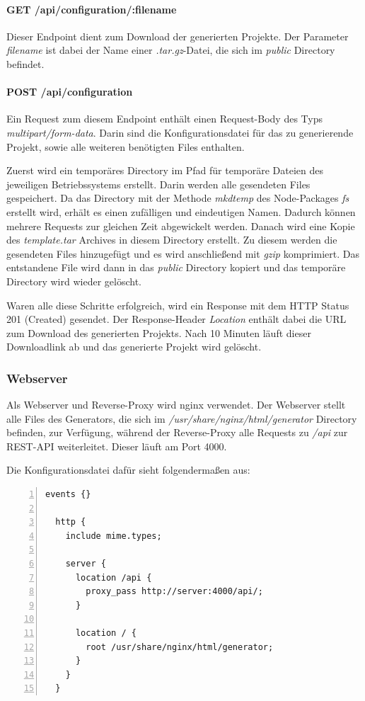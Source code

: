 \paragraph{GET /api/configuration/:filename}
Dieser Endpoint dient zum Download der generierten Projekte.
Der Parameter \textit{filename} ist dabei der Name einer \textit{.tar.gz}-Datei, die sich im \textit{public}
Directory befindet.

\paragraph{POST /api/configuration}
Ein Request zum diesem Endpoint enthält einen Request-Body des Typs
\textit{multipart/form-data}.
Darin sind die Konfigurationsdatei für das zu generierende Projekt, sowie alle weiteren benötigten Files enthalten.

Zuerst wird ein temporäres Directory im Pfad für temporäre Dateien des jeweiligen Betriebssystems erstellt.
Darin werden alle gesendeten Files gespeichert.
Da das Directory mit der Methode \textit{mkdtemp} des Node-Packages \textit{fs} erstellt wird, erhält es einen
zufälligen und eindeutigen Namen.
Dadurch können mehrere Requests zur gleichen Zeit abgewickelt werden.
Danach wird eine Kopie des \textit{template.tar} Archives in diesem Directory erstellt.
Zu diesem werden die gesendeten Files hinzugefügt und es wird anschließend mit \textit{gzip} komprimiert.
Das entstandene File wird dann in das \textit{public} Directory kopiert und das temporäre Directory wird wieder gelöscht.

Waren alle diese Schritte erfolgreich, wird ein Response mit dem HTTP Status 201 (Created)
gesendet.
Der Response-Header \textit{Location} enthält dabei die URL zum Download des generierten Projekts.
Nach 10 Minuten läuft dieser Downloadlink ab und das generierte Projekt wird gelöscht.

\subsubsection{Webserver}
Als Webserver und Reverse-Proxy wird nginx verwendet.
Der Webserver stellt alle Files des Generators, die sich im \textit{/usr/share/nginx/html/generator} Directory
befinden, zur Verfügung, während der Reverse-Proxy alle Requests zu \textit{/api} zur REST-API weiterleitet.
Dieser läuft am Port 4000.

Die Konfigurationsdatei dafür sieht folgendermaßen aus:

\begin{lstlisting}[numbers=left]
  events {}

  http {
    include mime.types;

    server {
      location /api {
        proxy_pass http://server:4000/api/;
      }

      location / {
        root /usr/share/nginx/html/generator;
      }
    }
  }
\end{lstlisting}

